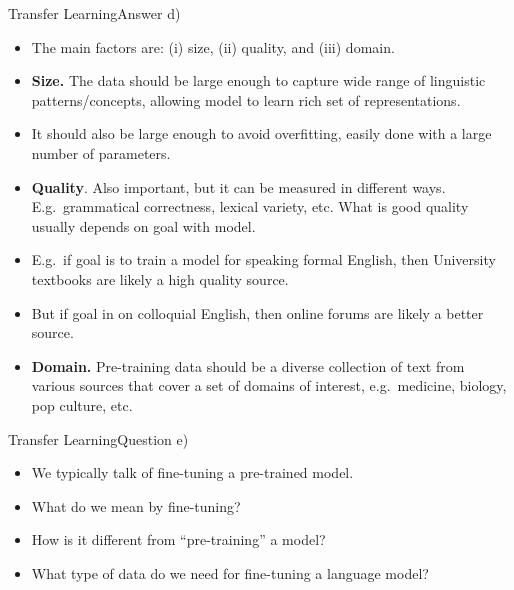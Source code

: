 \documentclass[t]{beamer}
\begin{document}
\begin{frame}{Transfer Learning}{Answer d)}
    \begin{itemize}
        \item The main factors are: (i) size, (ii) quality, and (iii) domain.
        \item \textbf{Size.} The data should be large enough to capture wide
              range of linguistic patterns/concepts, allowing model to
              learn rich set of representations.
        \item It should also be large enough to avoid overfitting, easily done
              with a large number of parameters.

        \item \textbf{Quality}. Also important, but it can be
              measured in different ways.
              E.g.\ grammatical correctness, lexical variety, etc.
              What is good quality usually depends on goal with model.
        \item E.g.\ if goal is to train a model for speaking formal English,
              then University textbooks are likely a high quality source.
        \item But if goal in on colloquial English, then online forums are
              likely a better source.

        \item \textbf{Domain.} Pre-training data should be a diverse collection
              of text from various sources that cover a set of domains of
              interest, e.g.\ medicine, biology, pop culture, etc.
    \end{itemize}
\end{frame}

\begin{frame}{Transfer Learning}{Question e)}
    \begin{itemize}
        \item We typically talk of fine-tuning a pre-trained model.
        \item What do we mean by fine-tuning?
        \item How is it different from ``pre-training'' a model?
        \item What type of data do we need for fine-tuning a language model?
    \end{itemize}
\end{frame}
\end{document}
